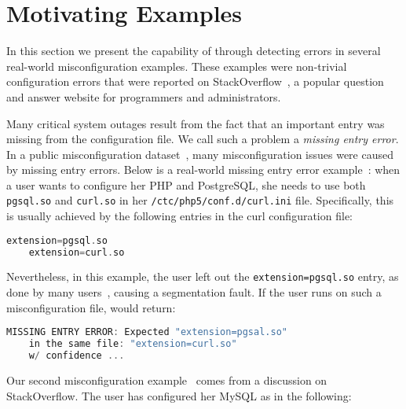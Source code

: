 \section{Motivating Examples}
\label{sec-motiv}

In this section we present the capability of \app through 
detecting errors in several real-world misconfiguration examples. 
These examples were non-trivial configuration errors
that were reported on StackOverflow~\cite{stackoverflow},
a popular question and answer website for programmers and administrators. 

Many critical system outages result from the fact that an important
entry was missing from the configuration file. 
We call such a problem a {\em missing entry error}.
In a public misconfiguration dataset~\cite{configdataset},
many misconfiguration issues were caused by
missing entry errors.
Below is a real-world missing entry error example~\cite{missingentry}:
when a user wants to configure her PHP and PostgreSQL,
she needs to use both {\tt pgsql.so} and {\tt curl.so}
in her {\tt /ctc/php5/conf.d/curl.ini} file.
Specifically, this is usually
achieved by the following entries in 
the curl configuration file:

\begin{lstlisting}[language=C, xleftmargin=.01\textwidth]
    extension=pgsql.so
    extension=curl.so
\end{lstlisting} 

Nevertheless, in this example, the user 
left out the {\tt extension=pgsql.so} entry, 
as done by many users~\cite{yin11anempirical, missingentry}, 
causing a segmentation fault. 
If the user runs \app on such a misconfiguration file,
\app would return:

\begin{lstlisting}[language=C, xleftmargin=.01\textwidth]
    MISSING ENTRY ERROR: Expected "extension=pgsal.so"
    in the same file: "extension=curl.so"
    w/ confidence ...
\end{lstlisting} 

\label{ex:fine}
Our second misconfiguration example~\cite{correlation} 
comes from a discussion on StackOverflow.
The user has configured her MySQL as in the following:

